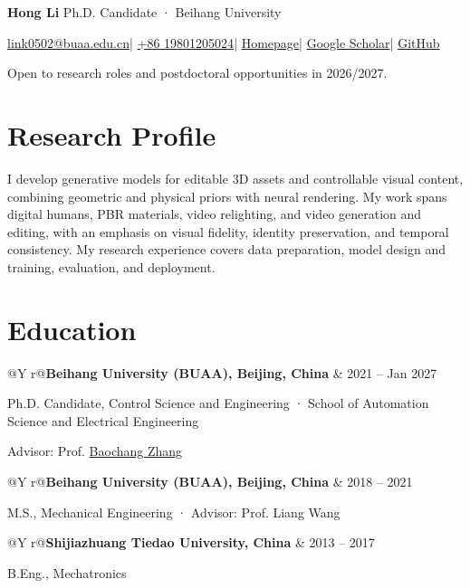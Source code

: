\documentclass[10pt,a4paper]{article}
\makeatletter
\newcommand{\ChineseName}[1]{{\ChineseNameFont #1}}
\newcommand{\entry}[3]{%
  \begin{tabularx}{\textwidth}{@{}Y r@{}}\textbf{#1} & {\small #2}\\\end{tabularx}\vspace{-2pt}\par
  {\small\color{muted}#3}\par}
\makeatother
\begin{document}
{\fontsize{28}{30}\selectfont\bfseries Hong Li}\enspace{\Large\ChineseName{李宏}}\hfill
{\small\color{accent}Ph.D. Candidate · Beihang University}
\par\vspace{5pt}
{\small
\href{mailto:link0502@buaa.edu.cn}{link0502@buaa.edu.cn}\enspace|\enspace
\href{tel:+8619801205024}{+86 19801205024}\enspace|\enspace
\href{https://luh1124.github.io/hongli.github.io/}{Homepage}\enspace|\enspace
\href{https://scholar.google.com/citations?user=5FBYzP8AAAAJ}{Google Scholar}\enspace|\enspace
\href{https://github.com/Luh1124}{GitHub}}
\par\vspace{4pt}
{\small\color{muted}Open to research roles and postdoctoral opportunities in 2026/2027.}

\section{Research Profile}
I develop generative models for editable 3D assets and controllable visual content, combining geometric and physical priors with neural rendering. My work spans digital humans, PBR materials, video relighting, and video generation and editing, with an emphasis on visual fidelity, identity preservation, and temporal consistency. My research experience covers data preparation, model design and training, evaluation, and deployment.

\section{Education}
\entry{Beihang University (BUAA), Beijing, China}{2021 -- Jan 2027}{Ph.D. Candidate, Control Science and Engineering · School of Automation Science and Electrical Engineering}
Advisor: Prof. \href{https://scholar.google.com/citations?user=ImJz6MsAAAAJ\&hl=zh-CN}{Baochang Zhang}
\par\vspace{4pt}
\entry{Beihang University (BUAA), Beijing, China}{2018 -- 2021}{M.S., Mechanical Engineering · Advisor: Prof. Liang Wang}
\vspace{4pt}
\entry{Shijiazhuang Tiedao University, China}{2013 -- 2017}{B.Eng., Mechatronics}
\end{document}
